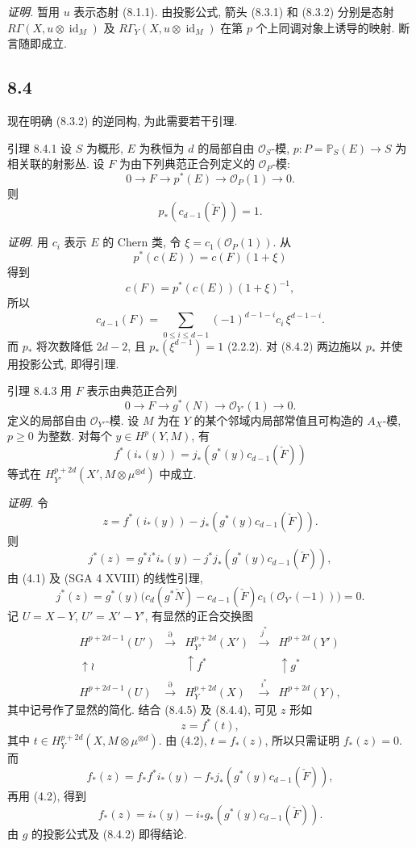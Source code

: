 \emph{证明.} 暂用 $u$ 表示态射 (8.1.1). 由投影公式, 箭头 (8.3.1) 和 (8.3.2) 分别是态射 $R\Gamma(X,u\otimes\operatorname{id}_M)$ 及 $R\Gamma_Y(X,u\otimes\operatorname{id}_M)$ 在第 $p$ 个上同调对象上诱导的映射. 断言随即成立.

\subsection*{8.4}

现在明确 (8.3.2) 的逆同构, 为此需要若干引理.

\begin{statement}{引理 8.4.1}
设 $S$ 为概形, $E$ 为秩恒为 $d$ 的局部自由 $\mathcal O_S$-模, $p:P=\mathbb P_S(E)\to S$ 为相关联的射影丛. 设 $F$ 为由下列典范正合列定义的 $\mathcal O_P$-模:
\[
0\to F\to p^*(E)\to\mathcal O_P(1)\to0.
\]
则
\[
p_*(c_{d-1}(\check F))=1.
\]
\end{statement}

\emph{证明.} 用 $c_i$ 表示 $E$ 的 Chern 类, 令 $\xi=c_1(\mathcal O_P(1))$. 从
\[
p^*(c(E))=c(F)(1+\xi)
\]
得到
\[
c(F)=p^*(c(E))(1+\xi)^{-1},
\]
所以
\[
c_{d-1}(F)=\sum_{0\le i\le d-1}(-1)^{d-1-i}c_i\,\xi^{d-1-i}.
\tag{8.4.2}
\]
而 $p_*$ 将次数降低 $2d-2$, 且 $p_*(\xi^{d-1})=1$ (2.2.2). 对 (8.4.2) 两边施以 $p_*$ 并使用投影公式, 即得引理.

\begin{statement}{引理 8.4.3}
用 $F$ 表示由典范正合列
\[
0\to F\to g^*(N)\to\mathcal O_{Y'}(1)\to0.
\]
定义的局部自由 $\mathcal O_{Y'}$-模. 设 $M$ 为在 $Y$ 的某个邻域内局部常值且可构造的 $A_X$-模, $p\ge0$ 为整数. 对每个 $y\in H^p(Y,M)$, 有
\[
f^*(i_*(y))=j_*(g^*(y)c_{d-1}(\check F))
\]
等式在 $H_{Y'}^{p+2d}(X',M\otimes\mu^{\otimes d})$ 中成立.
\end{statement}

\emph{证明.} 令
\[
z=f^*(i_*(y))-j_*(g^*(y)c_{d-1}(\check F)).
\]
则
\[
j^*(z)=g^*i^*i_*(y)-j^*j_*(g^*(y)c_{d-1}(\check F)),
\]
由 (4.1) 及 (SGA 4 XVIII) 的线性引理,
\[
j^*(z)=g^*(y)\bigl(c_d(g^*\check N)-c_{d-1}(\check F)c_1(\mathcal O_{Y'}(-1))\bigr)=0.
\tag{8.4.4}
\]
记 $U=X-Y$, $U'=X'-Y'$, 有显然的正合交换图
\[
\begin{array}{ccccc}
H^{p+2d-1}(U')&\xrightarrow{\partial}&H^{p+2d}_{Y'}(X')&\xrightarrow{j^*}&H^{p+2d}(Y')\\
\uparrow\wr&&\uparrow f^*&&\uparrow g^*\\
H^{p+2d-1}(U)&\xrightarrow{\partial}&H_Y^{p+2d}(X)&\xrightarrow{i^*}&H^{p+2d}(Y),
\end{array}
\tag{8.4.5}
\]
其中记号作了显然的简化. 结合 (8.4.5) 及 (8.4.4), 可见 $z$ 形如
\[
z=f^*(t),
\]
其中 $t\in H_Y^{p+2d}(X,M\otimes\mu^{\otimes d})$. 由 (4.2), $t=f_*(z)$, 所以只需证明 $f_*(z)=0$. 而
\[
f_*(z)=f_*f^*i_*(y)-f_*j_*(g^*(y)c_{d-1}(\check F)),
\]
再用 (4.2), 得到
\[
f_*(z)=i_*(y)-i_*g_*(g^*(y)c_{d-1}(\check F)).
\]
由 $g$ 的投影公式及 (8.4.2) 即得结论.


